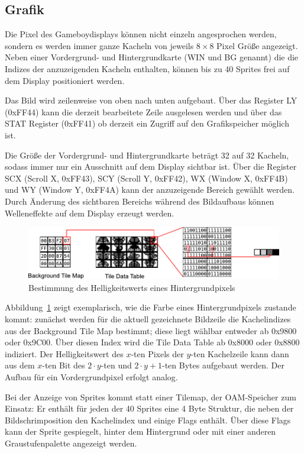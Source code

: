 \documentclass[a4paper]{scrartcl}
\begin{document}
\subsection{Grafik}

Die Pixel des Gameboydisplays können nicht einzeln angesprochen werden, sondern es werden immer ganze Kacheln von jeweils $8 \times 8$ Pixel Größe angezeigt. Neben einer Vordergrund- und Hintergrundkarte (WIN und BG genannt) die die Indizes der anzuzeigenden Kacheln enthalten, können bis zu 40 Sprites frei auf dem Display positioniert werden.

Das Bild wird zeilenweise von oben nach unten aufgebaut. Über das Register LY (0xFF44) kann die derzeit bearbeitete Zeile ausgelesen werden und über das STAT Register (0xFF41) ob derzeit ein Zugriff auf den Grafikspeicher möglich ist.

Die Größe der Vordergrund- und Hintergrundkarte beträgt 32 auf 32 Kacheln, sodass immer nur ein Ausschnitt auf dem Display sichtbar ist. Über die Register SCX (Scroll X, 0xFF43), SCY (Scroll Y, 0xFF42), WX (Window X, 0xFF4B) und WY (Window Y, 0xFF4A) kann der anzuzeigende Bereich gewählt werden. Durch Änderung des sichtbaren Bereichs während des Bildaufbaus können Welleneffekte auf dem Display erzeugt werden.

\begin{figure}[htbp]
\centering
\includegraphics[width=\linewidth]{img/bg_tiles}
\caption{Bestimmung des Helligkeitswerts eines Hintergrundpixels}
\label{img:bg_tiles}
\end{figure}

Abbildung~\ref{img:bg_tiles} zeigt exemplarisch, wie die Farbe eines Hintergrundpixels zustande kommt: zunächst werden für die aktuell gezeichnete Bildzeile die Kachelindizes aus der Background Tile Map bestimmt; diese liegt wählbar entweder ab 0x9800 oder 0x9C00. Über diesen Index wird die Tile Data Table ab 0x8000 oder 0x8800 indiziert. Der Helligkeitswert des $x$-ten Pixels der $y$-ten Kachelzeile kann dann aus dem $x$-ten Bit des $2 \cdot y$-ten und $2 \cdot y+1$-ten Bytes aufgebaut werden. Der Aufbau für ein Vordergrundpixel erfolgt analog.

Bei der Anzeige von Sprites kommt statt einer Tilemap, der OAM-Speicher zum Einsatz: Er enthält für jeden der 40 Sprites eine 4 Byte Struktur, die neben der Bildschrimposition den Kachelindex und einige Flags enthält. Über diese Flags kann der Sprite gespiegelt, hinter dem Hintergrund oder mit einer anderen Graustufenpalette angezeigt werden.
\end{document}
